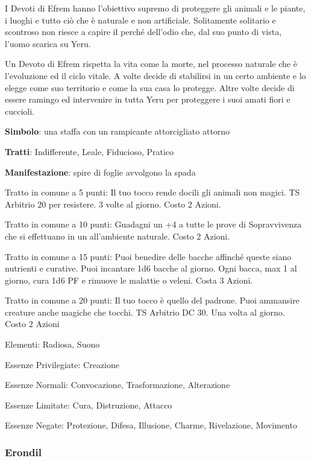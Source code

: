 \documentclass[a4paper,11pt,twoside,openany]{book}
\begin{document}
{I Devoti di Efrem hanno l'obiettivo supremo di proteggere gli animali e le piante, i luoghi e tutto ciò che è naturale e non artificiale. Solitamente solitario e scontroso non riesce a capire il perché dell'odio che, dal suo punto di vista, l'uomo scarica su Yeru.

Un Devoto di Efrem rispetta la vita come la morte, nel processo naturale che è l'evoluzione ed il ciclo vitale. A volte decide di stabilirsi in un certo ambiente e lo elegge come suo territorio e come la sua casa lo protegge. Altre volte decide di essere ramingo ed intervenire in tutta Yeru per proteggere i suoi amati fiori e cuccioli.

\textbf{Simbolo}: una staffa con un rampicante attorcigliato attorno

\textbf{Tratti}: Indifferente, Leale, Fiducioso, Pratico

\textbf{Manifestazione}: spire di foglie avvolgono la spada

\bigskip

Tratto in comune a 5 punti: Il tuo tocco rende docili gli animali non magici. TS Arbitrio 20 per resistere. 3 volte al giorno. Costo 2 Azioni.

Tratto in comune a 10 punti: Guadagni un +4 a tutte le prove di Sopravvivenza che si effettuano in un all'ambiente naturale. Costo 2 Azioni.

Tratto in comune a 15 punti: Puoi benedire delle bacche affinché queste siano nutrienti e curative. Puoi incantare 1d6 bacche al giorno. Ogni bacca, max 1 al giorno, cura 1d6 PF e rimuove le malattie o veleni. Costa 3 Azioni.

Tratto in comune a 20 punti: Il tuo tocco è quello del padrone. Puoi ammansire creature anche magiche che tocchi. TS Arbitrio DC 30. Una volta al giorno. Costo 2 Azioni

\bigskip

Elementi: Radiosa, Suono

\bigskip

Essenze Privilegiate: Creazione

Essenze Normali: Convocazione, Trasformazione, Alterazione

Essenze Limitate: Cura, Distruzione, Attacco

Essenze Negate: Protezione, Difesa, Illusione, Charme, Rivelazione, Movimento

\subsubsection{Erondil}

}
\end{document}
